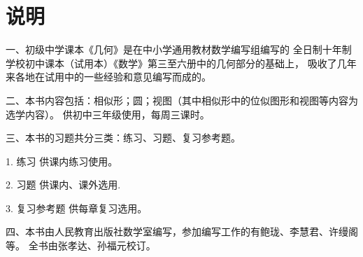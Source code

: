 
\chapter{说明}

一、初级中学课本《几何》是在中小学通用教材数学编写组编写的
全日制十年制学校初中课本（试用本）《数学》第三至六册中的几何部分的基础上，
吸收了几年来各地在试用中的一些经验和意见编写而成的。

二、本书内容包括：相似形；圆；视图（其中相似形中的位似图形和视图等内容为选学内容）。
供初中三年级使用，每周三课时。

三、本书的习题共分三类：练习、习题、复习参考题。

1. 练习 \quad 供课内练习使用。

2. 习题 \quad 供课内、课外选用.

3. 复习参考题 \quad 供每章复习选用。

四、本书由人民教育出版社数学室编写，参加编写工作的有鲍珑、李慧君、许缦阁等。
全书由张孝达、孙福元校订。

